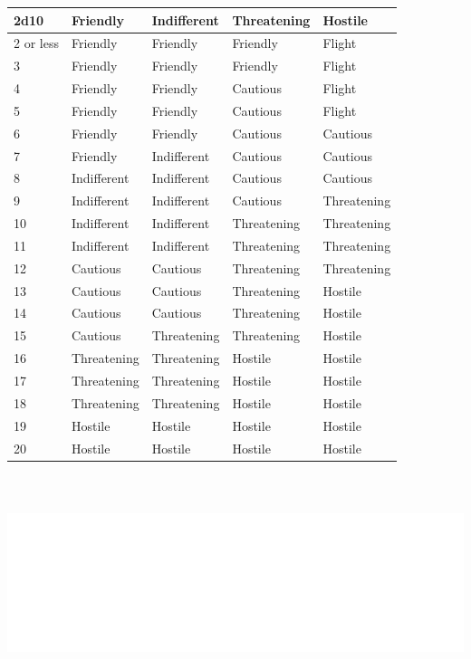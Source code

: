 \noindent
\begin{minipage}{\columnwidth}

\label{encounterreact}
\noindent
\begin{tabular}{|p{}|p{}|p{}|p{}|p{}|}
\hline
2d10		& Friendly	& Indifferent	& Threatening	& Hostile \\
\hline\hline
\rowcolor[gray]{.9}2 or less	& Friendly	& Friendly	& Friendly	& Flight \\
3			& Friendly	& Friendly	& Friendly	& Flight \\
\rowcolor[gray]{.9}4			& Friendly	& Friendly	& Cautious	& Flight \\
5			& Friendly	& Friendly	& Cautious	& Flight \\
\rowcolor[gray]{.9}6			& Friendly	& Friendly	& Cautious	& Cautious \\
7			& Friendly	& Indifferent	& Cautious	& Cautious \\
\rowcolor[gray]{.9}8			& Indifferent	& Indifferent	& Cautious	& Cautious \\
9			& Indifferent	& Indifferent	& Cautious	& Threatening \\
\rowcolor[gray]{.9}10			& Indifferent	& Indifferent	& Threatening	& Threatening \\
11			& Indifferent	& Indifferent	& Threatening	& Threatening \\
\rowcolor[gray]{.9}12			& Cautious	& Cautious	& Threatening	& Threatening \\
13			& Cautious	& Cautious	& Threatening	& Hostile \\
\rowcolor[gray]{.9}14			& Cautious	& Cautious	& Threatening	& Hostile \\
15			& Cautious	& Threatening	& Threatening	& Hostile \\
\rowcolor[gray]{.9}16			& Threatening	& Threatening	& Hostile		& Hostile \\
17			& Threatening	& Threatening	& Hostile		& Hostile \\
\rowcolor[gray]{.9}18			& Threatening	& Threatening	& Hostile		& Hostile \\
19			& Hostile		& Hostile		& Hostile		& Hostile \\
\rowcolor[gray]{.9}20			& Hostile		& Hostile		& Hostile		& Hostile \\
\hline
\end{tabular}

\end{minipage}

\noindent\includegraphics[width=6.75in, height=2.5in]{testblock.pdf} 
